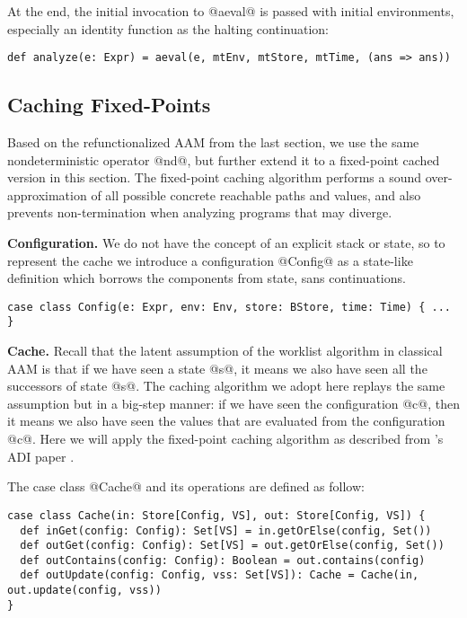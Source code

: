 \documentclass[acmsmall]{acmart}\settopmatter{}
\begin{document}
At the end, the initial invocation to @aeval@ is passed with initial environments,
especially an identity function as the halting continuation:
\begin{lstlisting}
def analyze(e: Expr) = aeval(e, mtEnv, mtStore, mtTime, (ans => ans))
\end{lstlisting}

\subsection{Caching Fixed-Points}

Based on the refunctionalized AAM from the last section, we use the same nondeterministic
operator @nd@, but further extend it to a fixed-point cached version in this section.
The fixed-point caching algorithm performs a sound over-approximation of all possible
concrete reachable paths and values, and also prevents non-termination when analyzing 
programs that may diverge.

\textbf{Configuration.}
We do not have the concept of an explicit stack or state, so to represent the cache 
we introduce a configuration @Config@ as a state-like definition which borrows the 
components from state, sans continuations.

\begin{lstlisting}
case class Config(e: Expr, env: Env, store: BStore, time: Time) { ... }
\end{lstlisting}

\textbf{Cache.}
Recall that the latent assumption of the worklist algorithm in classical AAM is that 
if we have seen a state @s@, it means we also have seen all the successors of state @s@.
The caching algorithm we adopt here replays the same assumption but in a big-step 
manner: if we have seen the configuration @c@, then it means we also have seen the 
values that are evaluated from the configuration @c@.
Here we will apply the fixed-point caching algorithm as described from
\citeauthor{darais2017abstracting}'s ADI paper \cite{darais2017abstracting}.

The case class @Cache@ and its operations are defined as follow:

\begin{lstlisting}
case class Cache(in: Store[Config, VS], out: Store[Config, VS]) {
  def inGet(config: Config): Set[VS] = in.getOrElse(config, Set())
  def outGet(config: Config): Set[VS] = out.getOrElse(config, Set())
  def outContains(config: Config): Boolean = out.contains(config)
  def outUpdate(config: Config, vss: Set[VS]): Cache = Cache(in, out.update(config, vss))
}
\end{lstlisting}
\end{document}
